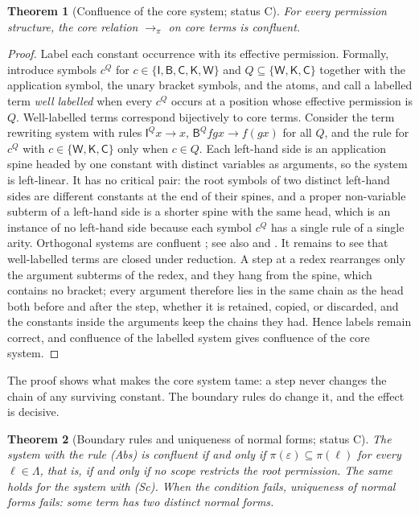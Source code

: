 \documentclass[11pt]{article}
\newtheorem{theorem}{Theorem}[section]
\theoremstyle{definition}
\theoremstyle{remark}
\newcommand{\cI}{\mathsf{I}}
\newcommand{\cB}{\mathsf{B}}
\newcommand{\cC}{\mathsf{C}}
\newcommand{\cK}{\mathsf{K}}
\newcommand{\cW}{\mathsf{W}}
\newcommand{\Ct}{status C}
\begin{document}
\begin{theorem}[Confluence of the core system; \Ct]\label{thm:core}
For every permission structure, the core relation $\to_\pi$ on core terms is confluent.
\end{theorem}

\begin{proof}
Label each constant occurrence with its effective permission. Formally, introduce symbols $c^Q$ for $c\in\{\cI,\cB,\cC,\cK,\cW\}$ and $Q\subseteq\{\cW,\cK,\cC\}$ together with the application symbol, the unary bracket symbols, and the atoms, and call a labelled term \emph{well labelled} when every $c^Q$ occurs at a position whose effective permission is $Q$. Well-labelled terms correspond bijectively to core terms. Consider the term rewriting system with rules $\cI^Q x\to x$, $\cB^Q f g x\to f(gx)$ for all $Q$, and the rule for $c^Q$ with $c\in\{\cW,\cK,\cC\}$ only when $c\in Q$. Each left-hand side is an application spine headed by one constant with distinct variables as arguments, so the system is left-linear. It has no critical pair: the root symbols of two distinct left-hand sides are different constants at the end of their spines, and a proper non-variable subterm of a left-hand side is a shorter spine with the same head, which is an instance of no left-hand side because each symbol $c^Q$ has a single rule of a single arity. Orthogonal systems are confluent \citep[Ch.~4]{terese2003}; see also \citet{rosen1973} and \citet{klop1992}. It remains to see that well-labelled terms are closed under reduction. A step at a redex rearranges only the argument subterms of the redex, and they hang from the spine, which contains no bracket; every argument therefore lies in the same chain as the head both before and after the step, whether it is retained, copied, or discarded, and the constants inside the arguments keep the chains they had. Hence labels remain correct, and confluence of the labelled system gives confluence of the core system.
\end{proof}

The proof shows what makes the core system tame: a step never changes the chain of any surviving constant. The boundary rules do change it, and the effect is decisive.

\begin{theorem}[Boundary rules and uniqueness of normal forms; \Ct]\label{thm:abs}
The system with the rule (Abs) is confluent if and only if $\pi(\varepsilon)\subseteq\pi(\ell)$ for every $\ell\in\Lambda$, that is, if and only if no scope restricts the root permission. The same holds for the system with (Sc). When the condition fails, uniqueness of normal forms fails: some term has two distinct normal forms.
\end{theorem}
\end{document}
